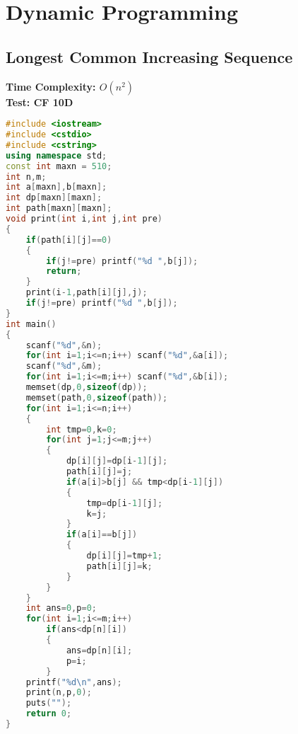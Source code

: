 \chapter{Dynamic Programming}

 \section{Longest Common Increasing Sequence}
 \textbf{Time Complexity: $O(n^2)$ \\ Test: CF 10D}
 \begin{lstlisting}[language=C++]
#include <iostream>
#include <cstdio>
#include <cstring>
using namespace std;
const int maxn = 510;
int n,m;
int a[maxn],b[maxn];
int dp[maxn][maxn];
int path[maxn][maxn];
void print(int i,int j,int pre)
{
	if(path[i][j]==0) 
	{
		if(j!=pre) printf("%d ",b[j]);
		return;
	}
	print(i-1,path[i][j],j);
	if(j!=pre) printf("%d ",b[j]);
}
int main()
{
	scanf("%d",&n);
	for(int i=1;i<=n;i++) scanf("%d",&a[i]);
	scanf("%d",&m);
	for(int i=1;i<=m;i++) scanf("%d",&b[i]);
	memset(dp,0,sizeof(dp));
	memset(path,0,sizeof(path));
	for(int i=1;i<=n;i++)
	{
		int tmp=0,k=0;
		for(int j=1;j<=m;j++)
		{
			dp[i][j]=dp[i-1][j];
			path[i][j]=j;
			if(a[i]>b[j] && tmp<dp[i-1][j]) 
			{
				tmp=dp[i-1][j];
				k=j;
			}
			if(a[i]==b[j]) 
			{
				dp[i][j]=tmp+1;
				path[i][j]=k;
			}
		}
	}
	int ans=0,p=0;
	for(int i=1;i<=m;i++)
		if(ans<dp[n][i])
		{
			ans=dp[n][i];
			p=i;
		}
	printf("%d\n",ans);
	print(n,p,0);
	puts("");
	return 0;
}
 \end{lstlisting}


\endinput